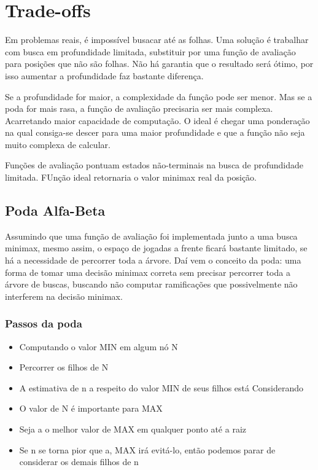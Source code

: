 \documentclass[sigplan,screen]{acmart}
\begin{document}
\section{Trade-offs}

Em problemas reais, é impossível busacar até as folhas. 
Uma solução é trabalhar com busca em profundidade limitada, substituir por uma função de avaliação para posições que não são folhas.
Não há garantia que o resultado será ótimo, por isso aumentar a profundidade faz bastante diferença.

Se a profundidade for maior, a complexidade da função pode ser menor. Mas se a poda for mais rasa, a função de avaliação precisaria ser mais complexa. 
Acarretando maior capacidade de computação. 
O ideal é chegar uma ponderação na qual consiga-se descer para uma maior profundidade e que a função não seja muito complexa de calcular.

Funções de avaliação pontuam estados não-terminais na busca de profundidade limitada.
FUnção ideal retornaria o valor minimax real da posição.

\subsection{Poda Alfa-Beta}
Assumindo que uma função de avaliação foi implementada junto a uma busca minimax, mesmo assim, o espaço de jogadas a frente ficará bastante limitado, se há a necessidade de percorrer toda a árvore.
Daí vem o conceito da poda: uma forma de tomar uma decisão minimax correta sem precisar percorrer toda a árvore de buscas, buscando não computar ramificações que possivelmente não interferem na decisão minimax.

\subsubsection{Passos da poda}
\begin{itemize}
  \item Computando o valor MIN em algum nó N
  \item Percorrer os filhos de N
  \item A estimativa de n a respeito do valor MIN de seus filhos está Considerando
  \item O valor de N é importante para MAX
  \item Seja a o melhor valor de MAX em qualquer ponto até a raiz
  \item Se n se torna pior que a, MAX irá evitá-lo, então podemos parar de considerar os demais filhos de n
\end{itemize}
\end{document}
